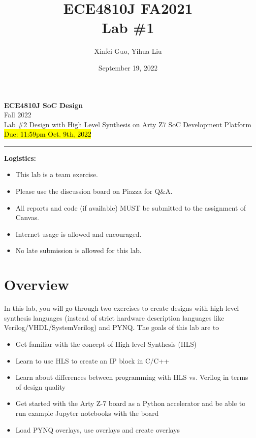 \documentclass[a4paper,12pt,twoside]{article}
\author{Xinfei Guo, Yihua Liu}
\title{ECE4810J FA2021\\ \small Lab \#1}
\date{September 19, 2022}
\begin{document}
\thispagestyle{fancy}

\begin{center}
    \vspace*{0pt}
    \Large{\textbf{ECE4810J SoC Design}}\\
    \vspace*{2pt}
    \large{Fall 2022}\\
    \vspace*{10pt}
    \Large{\textcolor{caption2color}{Lab \#2 Design with High Level Synthesis on Arty Z7 SoC Development Platform}}\\
    \normalsize{\hl{Due: 11:59pm Oct. 9th, 2022}}
    \rule[-5pt]{.97\linewidth}{0.05em}
\end{center}

\textbf{Logistics:}
\begin{itemize}
    \item This lab is a team exercise.
    \item Please use the discussion board on Piazza for Q\&A.
    \item All reports and code (if available) MUST be submitted to the assignment of Canvas.
    \item Internet usage is allowed and encouraged.
    \item No late submission is allowed for this lab.
\end{itemize}
\tableofcontents
\section{Overview}
In this lab, you will go through two exercises to create designs with high-level synthesis languages (instead of strict hardware description languages like Verilog/VHDL/SystemVerilog) and PYNQ. The goals of this lab are to
\begin{itemize}
    \item Get familiar with the concept of High-level Synthesis (HLS)
    \item Learn to use HLS to create an IP block in C/C++
    \item Learn about differences between programming with HLS vs. Verilog in terms of design quality
    \item Get started with the Arty Z-7 board as a Python accelerator and be able to run example Jupyter notebooks with the board
    \item Load PYNQ overlays, use overlays and create overlays
\end{itemize}
\end{document}
